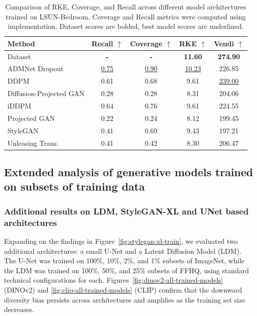 \documentclass{article}
\theoremstyle{plain}
\theoremstyle{definition}
\renewcommand{\cite}{\citep}
\begin{document}
\begin{appendices}
\begin{table}[ht]
\centering
\caption{Comparison of RKE, Coverage, and Recall across different model architectures trained on LSUN-Bedroom. Coverage and Recall metrics were computed using \citet{stein_exposing_2023} implementation. Dataset scores are bolded, best model scores are underlined.}
\label{tab:lsun_rke_vs_recall_coverage}
\begin{tabular}{lcccc}
\toprule
Method & Recall $\uparrow$ & Coverage $\uparrow$ & RKE $\uparrow$ & Vendi $\uparrow$ \\
\midrule
Dataset & \textbf{-} & \textbf{-} & \textbf{11.60} & \textbf{274.90} \\
\midrule
ADMNet Dropout \cite{dhariwal2021adm}& \underline{0.75} & \underline{0.90} & \underline{10.23} & 226.85\\
DDPM \cite{ho2020ddpm}& 0.61 & 0.68 & 9.61 & \underline{239.00}\\
Diffusion-Projected GAN \cite{wang2022diffprojgan}& 0.28 & 0.28 & 8.31 & 204.06 \\
iDDPM \cite{nichol2021iddpm}& 0.64 & 0.76 & 9.61 & 224.55\\
Projected GAN \cite{sauer2021projected-gan}& 0.22 & 0.24 & 8.12 & 199.45 \\
StyleGAN \cite{karras2019style}& 0.41 & 0.69 & 9.43 & 197.21\\
Unleasing Trans. \cite{bondtaylor2022unleashing}& 0.41 & 0.42 & 8.30 & 206.47 \\
\bottomrule
\end{tabular}
\end{table}


\goodbreak\newpage
\subsection{Extended analysis of generative models trained on subsets of training data}

\subsubsection{Additional results on LDM, StyleGAN-XL and UNet based architectures}
Expanding on the findings in Figure~\ref{fig:stylegan-xl-train}, we evaluated two additional architectures: a small U-Net and a Latent Diffusion Model (LDM). The U-Net was trained on 100\%, 10\%, 2\%, and 1\% subsets of ImageNet, while the LDM was trained on 100\%, 50\%, and 25\% subsets of FFHQ, using standard technical configurations for each. Figures~\ref{fig:dinov2-all-trained-models} (DINOv2) and \ref{fig:clip-all-trained-models} (CLIP) confirm that the downward diversity bias persists across architectures and amplifies as the training set size decreases.


\end{appendices}
\end{document}
